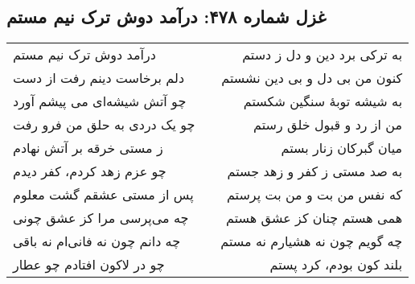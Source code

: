 \begin{center}
\section*{غزل شماره ۴۷۸: درآمد دوش ترک نیم مستم}
\label{sec:478}
\begin{longtable}{l p{0.5cm} r}
درآمد دوش ترک نیم مستم
&&
به ترکی برد دین و دل ز دستم
\\
دلم برخاست دینم رفت از دست
&&
کنون من بی دل و بی دین نشستم
\\
چو آتش شیشه‌ای می پیشم آورد
&&
به شیشه توبهٔ سنگین شکستم
\\
چو یک دردی به حلق من فرو رفت
&&
من از رد و قبول خلق رستم
\\
ز مستی خرقه بر آتش نهادم
&&
میان گبرکان زنار بستم
\\
چو عزم زهد کردم، کفر دیدم
&&
به صد مستی ز کفر و زهد جستم
\\
پس از مستی عشقم گشت معلوم
&&
که نفس من بت و من بت پرستم
\\
چه می‌پرسی مرا کز عشق چونی
&&
همی هستم چنان کز عشق هستم
\\
چه دانم چون نه فانی‌ام نه باقی
&&
چه گویم چون نه هشیارم نه مستم
\\
چو در لاکون افتادم چو عطار
&&
بلند کون بودم، کرد پستم
\\
\end{longtable}
\end{center}
